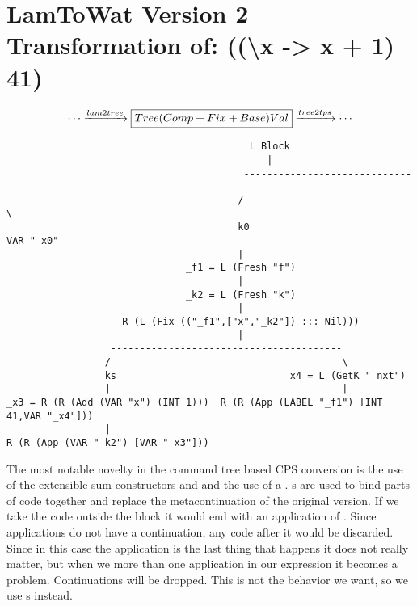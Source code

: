 \section{\label{section:v2printsimple}LamToWat Version 2 Transformation of: ((\textbackslash x -> x + 1) 41)}
\begin{landscape}
\begin{gather*}
  \cdots \xrightarrow{lam2tree} \boxed{Tree  (Comp + Fix + Base) Val} \xrightarrow{tree2tps} \cdots
\end{gather*}
\begin{lstlisting}
                                          L Block                                           
                                             |                                              
                                         ----------------------------------------------     
                                        /                                              \    
                                        k0                                         VAR "_x0"
                                        |                                                   
                               _f1 = L (Fresh "f")                                          
                                        |                                                   
                               _k2 = L (Fresh "k")                                          
                                        |                                                   
                    R (L (Fix (("_f1",["x","_k2"]) ::: Nil)))                               
                                        |                                                   
                  ----------------------------------------                                  
                 /                                        \                                 
                 ks                             _x4 = L (GetK "_nxt")                       
                 |                                        |                                 
_x3 = R (R (Add (VAR "x") (INT 1)))  R (R (App (LABEL "_f1") [INT 41,VAR "_x4"]))           
                 |                                                                          
R (R (App (VAR "_k2") [VAR "_x3"]))                                                         

\end{lstlisting}
The most notable novelty in the command tree based CPS conversion is the use of the extensible sum constructors  and  and the use of a . s are used to bind parts of code together and replace the metacontinuation of the original version. If we take the code outside the block it would end with an application of . Since applications do not have a continuation, any code after it would be discarded. Since in this case the application is the last thing that happens it does not really matter, but when we more than one application in our expression it becomes a problem. Continuations will be dropped. This is not the behavior we want, so we use s instead.
\end{landscape}
\clearpage


